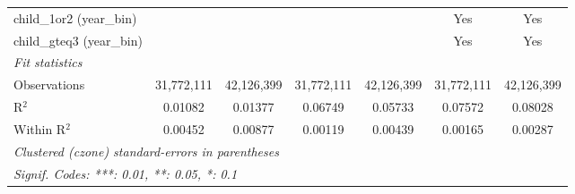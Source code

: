\begin{tabular}{lcccccc}
child\_1or2 (year\_bin) &  &  &  &  & Yes & Yes\\
child\_gteq3 (year\_bin) &  &  &  &  & Yes & Yes\\
\midrule \emph{Fit statistics}&  & & & & & \\
Observations & 31,772,111&42,126,399&31,772,111&42,126,399&31,772,111&42,126,399\\
R$^2$ & 0.01082&0.01377&0.06749&0.05733&0.07572&0.08028\\
Within R$^2$ & 0.00452&0.00877&0.00119&0.00439&0.00165&0.00287\\
\midrule\midrule\multicolumn{7}{l}{\emph{Clustered (czone) standard-errors in parentheses}}\\
\multicolumn{7}{l}{\emph{Signif. Codes: ***: 0.01, **: 0.05, *: 0.1}}\\
\end{tabular}


